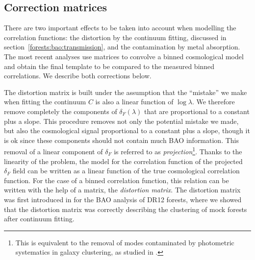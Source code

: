 \subsection{Correction matrices}
\label{forests:bao:matrices}

There are two important effects to be taken into account when modelling 
the \lya correlation functions: the distortion by the continuum fitting, discussed 
in section~\ref{forests:bao:transmission}, and the contamination by metal 
absorption. The most recent analyses use matrices to convolve a binned 
cosmological model and obtain the final template to be compared to 
the measured binned correlations. We describe both corrections below. 

The distortion matrix is built under the assumption that the ``mistake''
we make when fitting the continuum $C$ is also a linear function 
of $\log \lambda$. We therefore remove completely the components of $\delta_F(\lambda)$
that are proportional to a constant plus a slope. This procedure removes
not only the potential mistake we made, 
but also the cosmological signal proportional to a constant plus a slope,
though it is ok since these components should not contain much BAO information.
This removal of a linear component of $\delta_F$ is referred to as 
\emph{projection}\footnote{This is equivalent to the removal of modes 
contaminated by photometric systematics in galaxy clustering, as studied 
in \cite{paviotAngularSystematicsfreeCosmological2022}.}.
Thanks to the linearity of the problem, the model for the correlation function of 
the projected $\delta_F$ field can be written as a linear function of the 
true cosmological correlation function. For the case of a binned correlation function, 
this relation can be written with the help of a matrix, the \emph{distortion matrix}.
The distortion matrix was first introduced in \cite{bautistaMeasurementBaryonAcoustic2017}
for the BAO analysis of DR12 forests, where we showed that the distortion matrix 
was correctly describing the clustering of mock forests after continuum fitting. 

